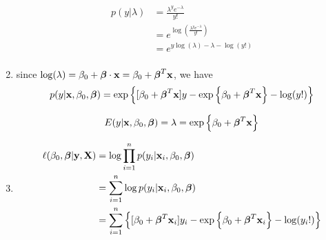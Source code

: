 \documentclass{article}
\newcommand{\vect}[1]{\boldsymbol{#1}}
\newcommand{\vectrm}[1]{\boldsymbol{\rm #1}}
\begin{document}
\begin{enumerate}[label=(\alph*)]
    \begin{align*}
      p(y | \lambda) &= \frac{\lambda^y e^{-\lambda}}{y!} \\
      &= e^{\log(\frac{\lambda^y e^{-\lambda}}{y!})} \\
      &= e^{y \log(\lambda) - \lambda - \log(y!)} \\
    \end{align*}

  \item
    since \(\log(\lambda) = \beta_0 + \vect{\beta}\cdot \vect{\rm x} = \beta_0 + \vect \beta^T \vectrm{x}\), we have
    \[
      p(y| \vectrm{x}, \beta_0, \vect{\beta}) = \exp\left\{ [\beta_0 + \vect{\beta}^T \vectrm{x}]y -
        \exp\left\{
          \beta_0 + \vect{\beta}^T \vectrm{x}
        \right\}
      - \log(y!)\right\}
    \]

    \[E(y| \vectrm{x}, \beta_0, \vect{\beta}) = \lambda =
      \exp\left\{
        \beta_0 + \vect{\beta}^T \vectrm{x}
      \right\}
    \]
  \item
    \begin{align*}
      \ell(\beta_0, \vect{\beta}| \vectrm{y}, \vectrm{X}) &= \log \prod_{i=1}^{n} p(y_i| \vectrm{x}_i, \beta_0, \vect{\beta}) \\
      &= \sum_{i=1}^{n} \log p(y_i| \vectrm{x}_i, \beta_0, \vect{\beta}) \\
        &= \sum_{i=1}^{n} \left\{ [\beta_0 + \vect{\beta}^T \vectrm{x}_i]y_i -
            \exp\left\{
            \beta_0 + \vect{\beta}^T \vectrm{x}_i
            \right\}
            - \log(y_i!)\right\} \\
    \end{align*}
\end{enumerate}

\newpage
\end{document}

